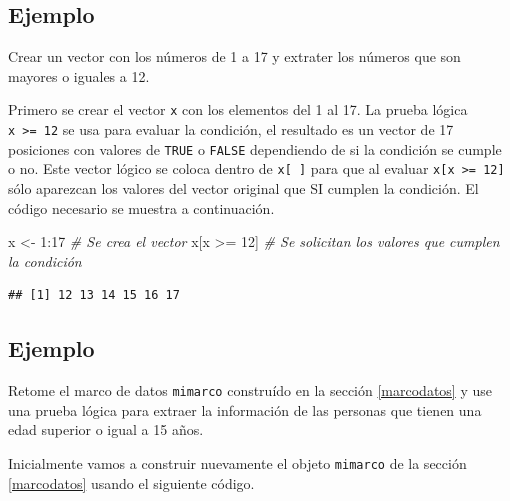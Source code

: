 \documentclass[10pt,]{krantz}
\makeatletter
\newenvironment{Shaded}{\begin{snugshade}}{\end{snugshade}}
\newcommand{\DecValTok}[1]{\textcolor[rgb]{0.00,0.00,0.81}{{#1}}}
\newcommand{\StringTok}[1]{\textcolor[rgb]{0.31,0.60,0.02}{{#1}}}
\newcommand{\CommentTok}[1]{\textcolor[rgb]{0.56,0.35,0.01}{\textit{{#1}}}}
\newcommand{\NormalTok}[1]{{#1}}
\newenvironment{kframe}{%
\medskip{}
\setlength{\fboxsep}{.8em}
 \def\at@end@of@kframe{}%
 \ifinner\ifhmode%
  \def\at@end@of@kframe{\end{minipage}}%
  \begin{minipage}{\columnwidth}%
 \fi\fi%
 \def\FrameCommand##1{\hskip\@totalleftmargin \hskip-\fboxsep
 \colorbox{shadecolor}{##1}\hskip-\fboxsep
     \hskip-\linewidth \hskip-\@totalleftmargin \hskip\columnwidth}%
 \MakeFramed {\advance\hsize-\width
   \@totalleftmargin\z@ \linewidth\hsize
   \@setminipage}}%
 {\par\unskip\endMakeFramed%
 \at@end@of@kframe}
\renewenvironment{Shaded}{\begin{kframe}}{\end{kframe}}
\makeatother
\begin{document}
\subsection*{Ejemplo}\label{ejemplo-6}


Crear un vector con los números de 1 a 17 y extrater los números que son
mayores o iguales a 12.

Primero se crear el vector \texttt{x} con los elementos del 1 al 17. La
prueba lógica \texttt{x\ \textgreater{}=\ 12} se usa para evaluar la
condición, el resultado es un vector de 17 posiciones con valores de
\texttt{TRUE} o \texttt{FALSE} dependiendo de si la condición se cumple
o no. Este vector lógico se coloca dentro de \texttt{x{[}\ {]}} para que
al evaluar \texttt{x{[}x\ \textgreater{}=\ 12{]}} sólo aparezcan los
valores del vector original que SI cumplen la condición. El código
necesario se muestra a continuación.

\begin{Shaded}
\begin{Highlighting}[]
\NormalTok{x <-}\StringTok{ }\DecValTok{1}\NormalTok{:}\DecValTok{17}  \CommentTok{# Se crea el vector}
\NormalTok{x[x >=}\StringTok{ }\DecValTok{12}\NormalTok{]  }\CommentTok{# Se solicitan los valores que cumplen la condición}
\end{Highlighting}
\end{Shaded}

\begin{verbatim}
## [1] 12 13 14 15 16 17
\end{verbatim}

\subsection*{Ejemplo}\label{ejemplo-7}


Retome el marco de datos \texttt{mimarco} construído en la sección
\ref{marcodatos} y use una prueba lógica para extraer la información de
las personas que tienen una edad superior o igual a 15 años.

Inicialmente vamos a construir nuevamente el objeto \texttt{mimarco} de
la sección \ref{marcodatos} usando el siguiente código.
\end{document}
